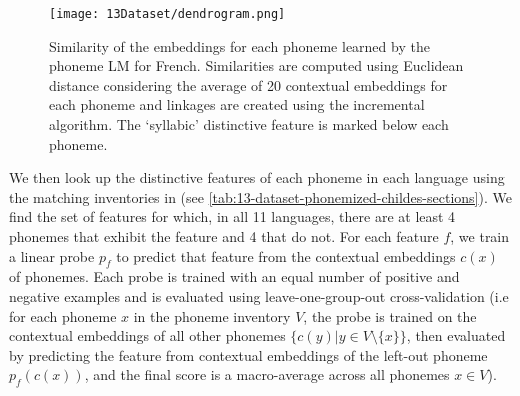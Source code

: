 \begin{figure}[t]
    \centering
    \texttt{[image: 13Dataset/dendrogram.png]}
    \caption{Similarity of the embeddings for each phoneme learned by the phoneme LM for French. Similarities are computed using Euclidean distance considering the average of 20 contextual embeddings for each phoneme and linkages are created using the incremental algorithm. The `syllabic' distinctive feature is marked below each phoneme.} %
    \label{fig:13-dendrogram}
\end{figure}

We then look up the distinctive features  of each phoneme in each language using the matching inventories in \phoible (see \cref{tab:13-dataset-phonemized-childes-sections}). We find the set of features for which, in all 11 languages, there are at least 4 phonemes that exhibit the feature and 4 that do not. %
For each feature $f$, we train a linear probe $p_f$ to predict that feature from the contextual embeddings $c(x)$ of phonemes. Each probe is trained with an equal number of positive and negative examples and is evaluated using leave-one-group-out cross-validation (i.e for each phoneme $x$ in the phoneme inventory $V$, the probe is trained on the contextual embeddings of all other phonemes $\{c(y) | y\in V \setminus \{x\}\}$, then evaluated by predicting the feature from contextual embeddings of the left-out phoneme $p_f(c(x))$, and the final score is a macro-average across all phonemes $x\in V$).



